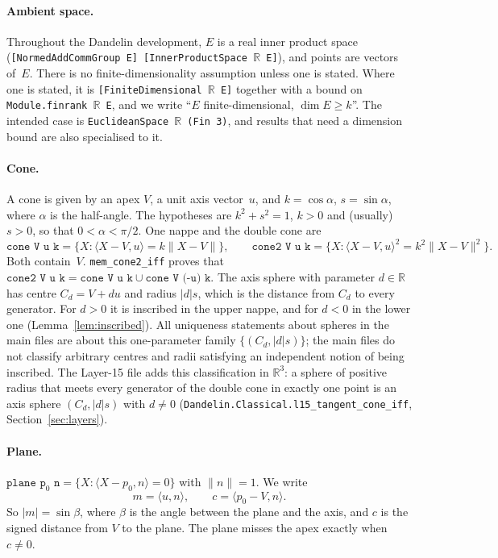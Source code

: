 \documentclass[11pt]{article}
\theoremstyle{remark}
\newcommand{\lean}[1]{\texttt{#1}}
\newcommand{\ip}[2]{\langle #1,#2\rangle}
\newcommand{\nm}[1]{\lVert #1\rVert}
\newcommand{\R}{\mathbb{R}}
\begin{document}
\paragraph{Ambient space.} Throughout the Dandelin development, $E$ is a real inner product space
(\lean{[NormedAddCommGroup E] [InnerProductSpace $\R$ E]}), and points are vectors of~$E$. There
is no finite-dimensionality assumption unless one is stated. Where one is stated, it is
\lean{[FiniteDimensional $\R$ E]} together with a bound on \lean{Module.finrank $\R$ E}, and we write
``$E$ finite-dimensional, $\dim E\ge k$''. The intended case is
\lean{EuclideanSpace $\R$ (Fin 3)}, and results that need a dimension bound are also specialised to
it.

\paragraph{Cone.} A cone is given by an apex $V$, a unit axis vector~$u$, and $k=\cos\alpha$,
$s=\sin\alpha$, where $\alpha$ is the half-angle. The hypotheses are $k^2+s^2=1$, $k>0$ and
(usually) $s>0$, so that $0<\alpha<\pi/2$. One nappe and the double cone are
\[
\lean{cone V u k}=\{X : \ip{X-V}{u}=k\nm{X-V}\},\qquad
\lean{cone2 V u k}=\{X : \ip{X-V}{u}^2=k^2\nm{X-V}^2\}.
\]
Both contain~$V$. \lean{mem\_cone2\_iff} proves that $\lean{cone2 V u k}=\lean{cone V u k}\cup\lean{cone V (-u) k}$.
The axis sphere with parameter $d\in\R$ has centre $C_d=V+du$ and radius $|d|s$, which is the
distance from $C_d$ to every generator. For $d>0$ it is inscribed in the upper nappe, and for
$d<0$ in the lower one (Lemma~\ref{lem:inscribed}). All uniqueness statements about spheres in
the main files are about this one-parameter family $\{(C_d,|d|s)\}$; the main files do not classify arbitrary
centres and radii satisfying an independent notion of being inscribed. The Layer-15 file adds this
classification in $\R^3$: a sphere of positive radius that meets every generator of the double
cone in exactly one point is an axis sphere $(C_d,|d|s)$ with $d\ne0$
(\lean{Dandelin.Classical.l15\_tangent\_cone\_iff}, Section~\ref{sec:layers}).

\paragraph{Plane.} $\lean{plane p}_0\lean{ n}=\{X:\ip{X-p_0}{n}=0\}$ with $\nm n=1$. We write
\[
m=\ip un,\qquad c=\ip{p_0-V}n .
\]
So $|m|=\sin\beta$, where $\beta$ is the angle between the plane and the axis, and $c$ is the signed
distance from $V$ to the plane. The plane misses the apex exactly when $c\neq0$.
\end{document}
